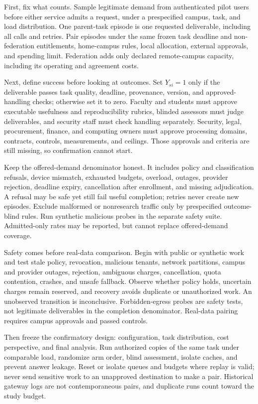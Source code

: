 \documentclass[11pt]{article}
\begin{document}
First, fix what counts. Sample legitimate demand from authenticated pilot users before either service admits a request, under a prespecified campus, task, and load distribution. One parent-task episode is one requested deliverable, including all calls and retries. Pair episodes under the same frozen task deadline and non-federation entitlements, home-campus rules, local allocation, external approvals, and spending limit. Federation adds only declared remote-campus capacity, including its operating and agreement costs.

Next, define success before looking at outcomes. Set $Y_{si}=1$ only if the deliverable passes task quality, deadline, provenance, version, and approved-handling checks; otherwise set it to zero. Faculty and students must approve executable usefulness and reproducibility rubrics, blinded assessors must judge deliverables, and security staff must check handling separately. Security, legal, procurement, finance, and computing owners must approve processing domains, contracts, controls, measurements, and ceilings. Those approvals and criteria are still missing, so confirmation cannot start.

Keep the offered-demand denominator honest. It includes policy and classification refusals, device mismatch, exhausted budgets, overload, outages, provider rejection, deadline expiry, cancellation after enrollment, and missing adjudication. A refusal may be safe yet still fail useful completion; retries never create new episodes. Exclude malformed or nonresearch traffic only by prespecified outcome-blind rules. Run synthetic malicious probes in the separate safety suite. Admitted-only rates may be reported, but cannot replace offered-demand coverage.

Safety comes before real-data comparison. Begin with public or synthetic work and test stale policy, revocation, malicious tenants, network partitions, campus and provider outages, rejection, ambiguous charges, cancellation, quota contention, crashes, and unsafe fallback. Observe whether policy holds, uncertain charges remain reserved, and recovery avoids duplicate or unauthorized work. An unobserved transition is inconclusive. Forbidden-egress probes are safety tests, not legitimate deliverables in the completion denominator. Real-data pairing requires campus approvals and passed controls.

Then freeze the confirmatory design: configuration, task distribution, cost perspective, and final analysis. Run authorized copies of the same task under comparable load, randomize arm order, blind assessment, isolate caches, and prevent answer leakage. Reset or isolate queues and budgets where replay is valid; never send sensitive work to an unapproved destination to make a pair. Historical gateway logs are not contemporaneous pairs, and duplicate runs count toward the study budget.
\end{document}
